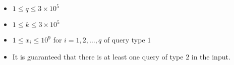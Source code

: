 \begin{itemize}
\tightlist
\item $1 \leq q \leq 3 \times 10 ^ 5$
\item $1 \leq k \leq 3 \times 10^5$
\item $1 \leq x_i \leq 10^9$ for $i = 1, 2, \ldots, q$ of query type $1$
\item It is guaranteed that there is at least one query of type $2$ in the input.
\end{itemize}
